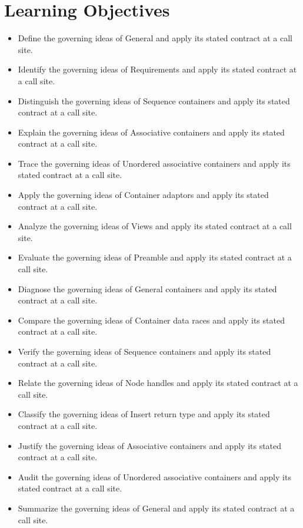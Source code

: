 \documentclass[11pt,letterpaper]{article}
\begin{document}
\section{Learning Objectives}
\begin{itemize}[label=\textcolor{CornellReferenceTeal}{$\blacktriangleright$}]
\item Define the governing ideas of General and apply its stated contract at a call site.
\item Identify the governing ideas of Requirements and apply its stated contract at a call site.
\item Distinguish the governing ideas of Sequence containers and apply its stated contract at a call site.
\item Explain the governing ideas of Associative containers and apply its stated contract at a call site.
\item Trace the governing ideas of Unordered associative containers and apply its stated contract at a call site.
\item Apply the governing ideas of Container adaptors and apply its stated contract at a call site.
\item Analyze the governing ideas of Views and apply its stated contract at a call site.
\item Evaluate the governing ideas of Preamble and apply its stated contract at a call site.
\item Diagnose the governing ideas of General containers and apply its stated contract at a call site.
\item Compare the governing ideas of Container data races and apply its stated contract at a call site.
\item Verify the governing ideas of Sequence containers and apply its stated contract at a call site.
\item Relate the governing ideas of Node handles and apply its stated contract at a call site.
\item Classify the governing ideas of Insert return type and apply its stated contract at a call site.
\item Justify the governing ideas of Associative containers and apply its stated contract at a call site.
\item Audit the governing ideas of Unordered associative containers and apply its stated contract at a call site.
\item Summarize the governing ideas of General and apply its stated contract at a call site.
\end{itemize}
\end{document}
